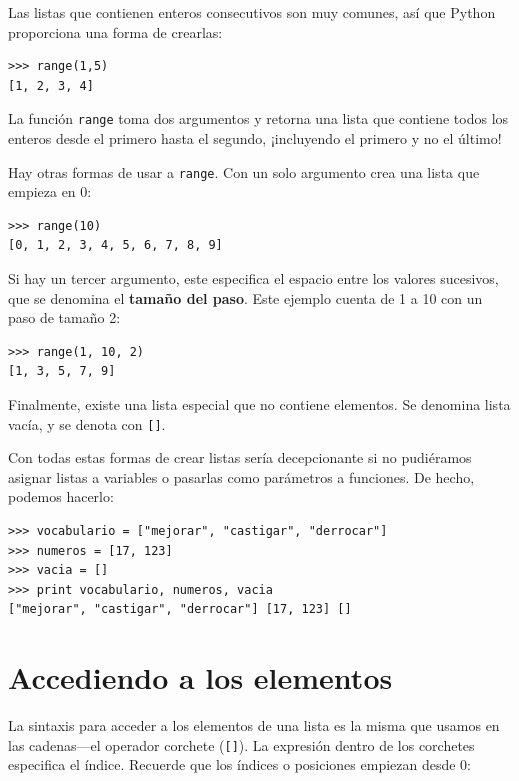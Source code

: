 
Las listas que contienen enteros consecutivos son muy comunes, así que
Python proporciona una forma de crearlas:

\beforeverb
\begin{verbatim}
>>> range(1,5)
[1, 2, 3, 4]
\end{verbatim}
\afterverb
%
La función  \texttt{range} toma dos argumentos y retorna una lista
que contiene todos los enteros desde el primero hasta el segundo,
¡incluyendo el primero y no el último!

Hay otras formas de usar a  \texttt{range}.  Con un solo argumento
crea una lista que empieza en  0:

\beforeverb
\begin{verbatim}
>>> range(10)
[0, 1, 2, 3, 4, 5, 6, 7, 8, 9]
\end{verbatim}
\afterverb
%
Si hay un tercer argumento, este especifica el espacio entre los
valores sucesivos, que se denomina el  {\bf tamaño del paso}.  Este 
ejemplo cuenta de  1 a 10 con un paso de tamaño 2:

\beforeverb
\begin{verbatim}
>>> range(1, 10, 2)
[1, 3, 5, 7, 9]
\end{verbatim}
\afterverb
%
Finalmente, existe una lista especial que no contiene elementos. Se 
denomina lista vacía, y se denota con  \texttt{[]}.

Con todas estas formas de crear listas sería decepcionante si no 
pudiéramos asignar listas a variables o pasarlas como parámetros
a funciones. De hecho, podemos hacerlo:

\beforeverb
\begin{verbatim}
>>> vocabulario = ["mejorar", "castigar", "derrocar"]
>>> numeros = [17, 123]
>>> vacia = []
>>> print vocabulario, numeros, vacia
["mejorar", "castigar", "derrocar"] [17, 123] []
\end{verbatim}
\afterverb
%


\section{Accediendo a los elementos}

La sintaxis para acceder a los elementos de una lista es la misma
que usamos en las cadenas---el operador corchete (\texttt{[]}).  La 
expresión dentro de los corchetes especifica el índice. Recuerde
que los índices o posiciones empiezan desde  0:

